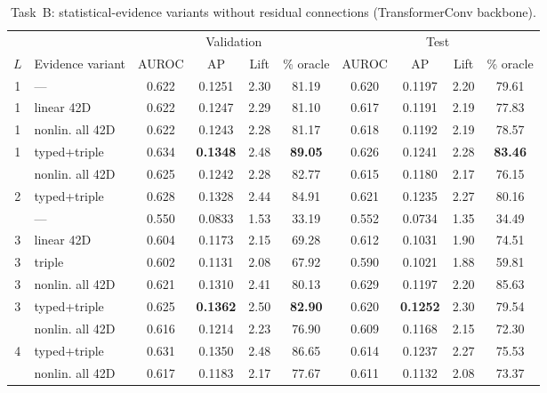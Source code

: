 \begin{table}[H]
  \centering
  \small
  \setlength{\tabcolsep}{4pt}
  \caption{Task~B: statistical-evidence variants without residual connections
    (TransformerConv backbone).}
  \label{tab:hcr-nores}
  \begin{tabular}{clcccccccc}
    \toprule
    & & \multicolumn{4}{c}{Validation} & \multicolumn{4}{c}{Test} \\
    \cmidrule(lr){3-6}\cmidrule(lr){7-10}
    $L$ & Evidence variant & AUROC & AP & Lift & \% oracle & AUROC & AP & Lift & \% oracle \\
    \midrule
    1 & ---              & 0.622 & 0.1251 & 2.30 & 81.19 & 0.620 & 0.1197 & 2.20 & 79.61 \\
    1 & linear 42D       & 0.622 & 0.1247 & 2.29 & 81.10 & 0.617 & 0.1191 & 2.19 & 77.83 \\
    1 & nonlin. all 42D  & 0.622 & 0.1243 & 2.28 & 81.17 & 0.618 & 0.1192 & 2.19 & 78.57 \\
    1 & typed+triple     & 0.634 & \textbf{0.1348} & 2.48 & \textbf{89.05} & 0.626 & 0.1241 & 2.28 & \textbf{83.46} \\
    \addlinespace[4pt]
    2 & nonlin. all 42D  & 0.625 & 0.1242 & 2.28 & 82.77 & 0.615 & 0.1180 & 2.17 & 76.15 \\
    2 & typed+triple     & 0.628 & 0.1328 & 2.44 & 84.91 & 0.621 & 0.1235 & 2.27 & 80.16 \\
    \addlinespace[4pt]
    3 & ---              & 0.550 & 0.0833 & 1.53 & 33.19 & 0.552 & 0.0734 & 1.35 & 34.49 \\
    3 & linear 42D       & 0.604 & 0.1173 & 2.15 & 69.28 & 0.612 & 0.1031 & 1.90 & 74.51 \\
    3 & triple           & 0.602 & 0.1131 & 2.08 & 67.92 & 0.590 & 0.1021 & 1.88 & 59.81 \\
    3 & nonlin. all 42D  & 0.621 & 0.1310 & 2.41 & 80.13 & 0.629 & 0.1197 & 2.20 & 85.63 \\
    3 & typed+triple     & 0.625 & \textbf{0.1362} & 2.50 & \textbf{82.90} & 0.620 & \textbf{0.1252} & 2.30 & 79.54 \\
    \addlinespace[4pt]
    4 & nonlin. all 42D  & 0.616 & 0.1214 & 2.23 & 76.90 & 0.609 & 0.1168 & 2.15 & 72.30 \\
    4 & typed+triple     & 0.631 & 0.1350 & 2.48 & 86.65 & 0.614 & 0.1237 & 2.27 & 75.53 \\
    \addlinespace[4pt]
    5 & nonlin. all 42D  & 0.617 & 0.1183 & 2.17 & 77.67 & 0.611 & 0.1132 & 2.08 & 73.37 \\

\end{tabular}
\end{table}
